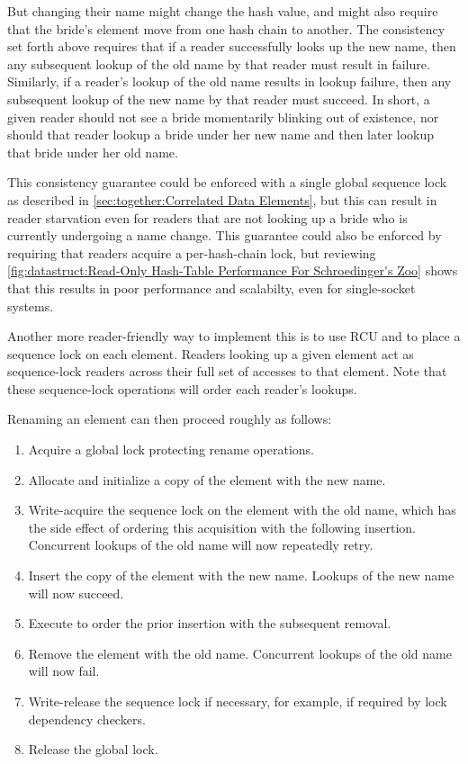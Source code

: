But changing their name might change the hash value, and might also
require that the bride's element move from one hash chain to another.
The consistency set forth above requires that if a reader successfully
looks up the new name, then any subsequent lookup of the old name by
that reader must result in failure.
Similarly, if a reader's lookup of the old name results in lookup failure,
then any subsequent lookup of the new name by that reader must succeed.
In short, a given reader should not see a bride momentarily blinking out
of existence, nor should that reader lookup a bride under her new name
and then later lookup that bride under her old name.

This consistency guarantee could be enforced with a single global sequence
lock as described in \cref{sec:together:Correlated Data Elements}, but
this can result in reader starvation even for readers that are not looking
up a bride who is currently undergoing a name change.
This guarantee could also be enforced by requiring that readers acquire
a per-hash-chain lock, but reviewing
\cref{fig:datastruct:Read-Only Hash-Table Performance For Schroedinger's Zoo}
shows that this results in poor performance and scalabilty, even for
single-socket systems.

Another more reader-friendly way to implement this is to use RCU and to
place a sequence lock on each element.
Readers looking up a given element act as sequence-lock readers across
their full set of accesses to that element.
Note that these sequence-lock operations will order each reader's lookups.

Renaming an element can then proceed roughly as follows:

\begin{enumerate}
\item	Acquire a global lock protecting rename operations.
\item	Allocate and initialize a copy of the element with the new name.
\item	Write-acquire the sequence lock on the element with the old name,
	which has the side effect of ordering this acquisition with the
	following insertion.
	Concurrent lookups of the old name will now repeatedly retry.
\item	Insert the copy of the element with the new name.
	Lookups of the new name will now succeed.
\item	Execute  to order the prior insertion with the
	subsequent removal.
\item	Remove the element with the old name.
	Concurrent lookups of the old name will now fail.
\item	Write-release the sequence lock if necessary, for example, if
	required by lock dependency checkers.
\item	Release the global lock.
\end{enumerate}

